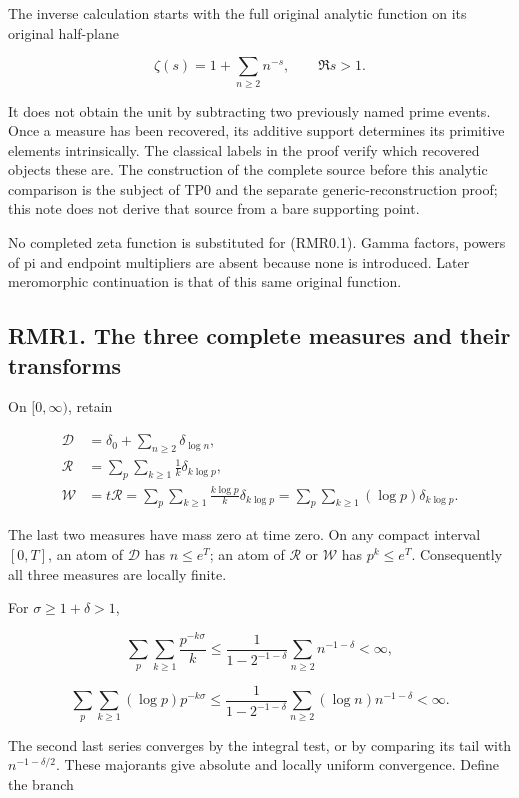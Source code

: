 \documentclass[
]{article}
\newcounter{none} %
\begin{document}
The inverse calculation starts with the full original analytic function
on its original half-plane

\[
\zeta(s)=1+\sum_{n\ge2}n^{-s},\qquad \Re s>1.
\tag{RMR0.1}
\]

It does not obtain the unit by subtracting two previously named prime
events. Once a measure has been recovered, its additive support
determines its primitive elements intrinsically. The classical labels in
the proof verify which recovered objects these are. The construction of
the complete source before this analytic comparison is the subject of
TP0 and the separate generic-reconstruction proof; this note does not
derive that source from a bare supporting point.

No completed zeta function is substituted for (RMR0.1). Gamma factors,
powers of pi and endpoint multipliers are absent because none is
introduced. Later meromorphic continuation is that of this same original
function.

\subsection{RMR1. The three complete measures and their
transforms}\label{rmr1.-the-three-complete-measures-and-their-transforms}

On \([0,\infty)\), retain

\[
\begin{aligned}
\mathcal D&=\delta_0+\sum_{n\ge2}\delta_{\log n},\\
\mathcal R&=\sum_p\sum_{k\ge1}\frac1k\delta_{k\log p},\\
\mathcal W&=t\mathcal R
=\sum_p\sum_{k\ge1}\frac{k\log p}{k}\delta_{k\log p}
=\sum_p\sum_{k\ge1}(\log p)\delta_{k\log p}.
\end{aligned}
\tag{RMR1.1}
\]

The last two measures have mass zero at time zero. On any compact
interval \([0,T]\), an atom of \(\mathcal D\) has \(n\le e^T\); an atom
of \(\mathcal R\) or \(\mathcal W\) has \(p^k\le e^T\). Consequently all
three measures are locally finite.

For \(\sigma\ge1+\delta>1\),

\[
\sum_p\sum_{k\ge1}\frac{p^{-k\sigma}}k
\le \frac{1}{1-2^{-1-\delta}}\sum_{n\ge2}n^{-1-\delta}<\infty,
\]

\[
\sum_p\sum_{k\ge1}(\log p)p^{-k\sigma}
\le \frac{1}{1-2^{-1-\delta}}
\sum_{n\ge2}(\log n)n^{-1-\delta}<\infty.
\tag{RMR1.2}
\]

The second last series converges by the integral test, or by comparing
its tail with \(n^{-1-\delta/2}\). These majorants give absolute and
locally uniform convergence. Define the branch
\end{document}
